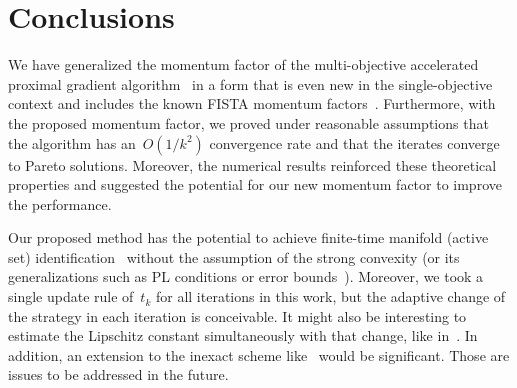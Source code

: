 \documentclass[../main]{subfiles}
\begin{document}
\section{Conclusions}
We have generalized the momentum factor of the multi-objective accelerated proximal gradient algorithm~\cite{Tanabe2022a} in a form that is even new in the single-objective context and includes the known FISTA momentum factors~\cite{Beck2009,Chambolle2015}.
Furthermore, with the proposed momentum factor, we proved under reasonable assumptions that the algorithm has an~$O(1/k^2)$ convergence rate and that the iterates converge to Pareto solutions.
Moreover, the numerical results reinforced these theoretical properties and suggested the potential for our new momentum factor to improve the performance.

Our proposed method has the potential to achieve finite-time manifold (active set) identification~\cite{Sun2019} without the assumption of the strong convexity (or its generalizations such as PL conditions or error bounds~\cite{Karimi2016}).
Moreover, we took a single update rule of~$t_k$ for all iterations in this work, but the adaptive change of the strategy in each iteration is conceivable.
It might also be interesting to estimate the Lipschitz constant simultaneously with that change, like in~\cite{Scheinberg2014}.
In addition, an extension to the inexact scheme like~\cite{Villa2013} would be significant.
Those are issues to be addressed in the future.
\end{document}
